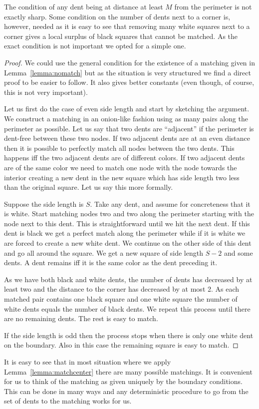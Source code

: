 \documentclass{article}\usepackage[a4paper,margin=20mm]{geometry}
\begin{document}
\begin{remark}
The condition of any dent being at distance at least
$M$ from the perimeter is not exactly sharp.
Some condition on the number of dents next to
a corner is, however, needed as it is easy to see that removing many white
squares next to a corner gives a local surplus of black
squares that cannot be matched.  As the exact condition
is not important we opted for a simple one.
\end{remark}

\begin{proof}
We could use the general condition for the existence 
of a matching given in Lemma~\ref{lemma:nomatch} but
as the situation is very structured we find a direct
proof to be easier to follow.  It also gives better
constants (even though, of course, this is not very important).

Let us first do the case of even side length and
start by sketching the argument.  We construct
a matching in an onion-like fashion using as many pairs
along the perimeter as possible.  Let us say that two dents
are ``adjacent'' if the perimeter is dent-free between these
two nodes.  If two adjacent dents are 
at an even distance then it is possible to perfectly
match all nodes between the two dents.  This happens
iff the two adjacent dents are of different colors.
If two adjacent dents are of the same color we need
to match one node with the node towards the interior
creating a new dent in the new square which has side
length two less than the original square.  Let us
say this more formally.

Suppose the side length is $S$.
Take any dent, and assume for concreteness that it is white.
Start matching nodes two and two
along the perimeter starting with the node next to this dent. 
This is straightforward until we hit the next dent.
If this dent is black we get a perfect match along the perimeter
while if it is white we are forced to create a new white dent.
We continue on the other side of this dent and go all around
the square.  We get a new square of side length $S-2$ and
some dents.  A dent remains iff it is the same color 
as the dent preceding it.

As we have both black and white dents, the number
of dents has decreased by at least two and the distance
to the corner has decreased by at most 2.  As each
matched pair contains one black square and one white
square the number of white dents equals the number
of black dents.
We repeat this process until there are no remaining dents.
The rest is easy to match.

If the side length is odd then the process stops
when there is only one white dent on the boundary.
Also in this case the remaining square is easy to
match.
\end{proof}
It is easy to see that in most situation where we
apply Lemma~\ref{lemma:matchcenter} there are many possible
matchings.  It is convenient for us
to think of the matching as given uniquely by the boundary conditions.
This can be done in many ways and any deterministic procedure
to go from the set of dents to the matching works
for us.
\end{document}
